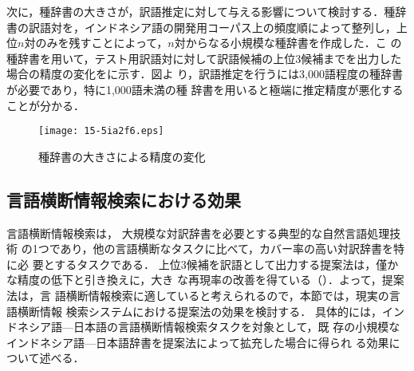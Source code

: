 \documentclass[japanese]{jnlp_1.4}
\newcommand{\figref}[1]{}
\begin{document}
次に，種辞書の大きさが，訳語推定に対して与える影響について検討する．種辞
書の訳語対を，インドネシア語の開発用コーパス上の頻度順によって整列し，上
位$n$対のみを残すことによって，$n$対からなる小規模な種辞書を作成した．こ
の種辞書を用いて，テスト用訳語対に対して訳語候補の上位3候補までを出力した
場合の精度の変化を\figref{fig:種辞書の大きさによる精度の変化}に示す．図よ
り，訳語推定を行うには3,000語程度の種辞書が必要であり，特に1,000語未満の種
辞書を用いると極端に推定精度が悪化することが分かる．

\begin{figure}[t]
  \begin{center}
   \texttt{[image: 15-5ia2f6.eps]}
  \end{center}
  \caption{種辞書の大きさによる精度の変化}
  \label{fig:種辞書の大きさによる精度の変化}
\end{figure}


\subsection{言語横断情報検索における効果}
\label{subsec:CLIR_experiment}

言語横断情報検索は，
\pagebreak
大規模な対訳辞書を必要とする典型的な自然言語処理技術
の1つであり，他の言語横断なタスクに比べて，カバー率の高い対訳辞書を特に必
要とするタスクである．
上位3候補を訳語として出力する提案法は，僅かな精度の低下と引き換えに，大き
な再現率の改善を得ている（\figref{fig:閾値の比較}）．よって，提案法は，言
語横断情報検索に適していると考えられるので，本節では，現実の言語横断情報
検索システムにおける提案法の効果を検討する．
具体的には，インドネシア語—日本語の言語横断情報検索タスクを対象として，既
存の小規模なインドネシア語—日本語辞書を提案法によって拡充した場合に得られ
る効果について述べる．
\end{document}
